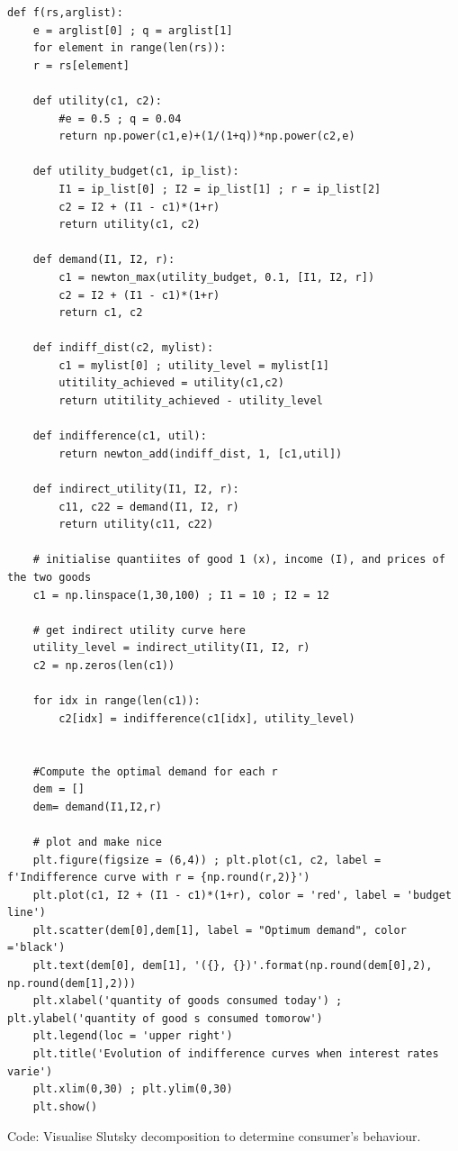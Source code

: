 \documentclass[a4paper, 12pt, reqno]{article}
\begin{document}
\begin{lstlisting}[frame=single]
def f(rs,arglist):
    e = arglist[0] ; q = arglist[1]
    for element in range(len(rs)):
    r = rs[element]

    def utility(c1, c2):
        #e = 0.5 ; q = 0.04
        return np.power(c1,e)+(1/(1+q))*np.power(c2,e)

    def utility_budget(c1, ip_list):
        I1 = ip_list[0] ; I2 = ip_list[1] ; r = ip_list[2]
        c2 = I2 + (I1 - c1)*(1+r)
        return utility(c1, c2)
        
    def demand(I1, I2, r):
        c1 = newton_max(utility_budget, 0.1, [I1, I2, r])
        c2 = I2 + (I1 - c1)*(1+r)
        return c1, c2

    def indiff_dist(c2, mylist): 
        c1 = mylist[0] ; utility_level = mylist[1]
        utitility_achieved = utility(c1,c2)
        return utitility_achieved - utility_level

    def indifference(c1, util):
        return newton_add(indiff_dist, 1, [c1,util])

    def indirect_utility(I1, I2, r):
        c11, c22 = demand(I1, I2, r)
        return utility(c11, c22)

    # initialise quantiites of good 1 (x), income (I), and prices of the two goods
    c1 = np.linspace(1,30,100) ; I1 = 10 ; I2 = 12

    # get indirect utility curve here
    utility_level = indirect_utility(I1, I2, r)
    c2 = np.zeros(len(c1))

    for idx in range(len(c1)):
        c2[idx] = indifference(c1[idx], utility_level)


    #Compute the optimal demand for each r
    dem = []
    dem= demand(I1,I2,r)    

    # plot and make nice
    plt.figure(figsize = (6,4)) ; plt.plot(c1, c2, label = f'Indifference curve with r = {np.round(r,2)}')
    plt.plot(c1, I2 + (I1 - c1)*(1+r), color = 'red', label = 'budget line')
    plt.scatter(dem[0],dem[1], label = "Optimum demand", color ='black')
    plt.text(dem[0], dem[1], '({}, {})'.format(np.round(dem[0],2), np.round(dem[1],2)))
    plt.xlabel('quantity of goods consumed today') ; plt.ylabel('quantity of good s consumed tomorow')
    plt.legend(loc = 'upper right')
    plt.title('Evolution of indifference curves when interest rates varie')
    plt.xlim(0,30) ; plt.ylim(0,30)
    plt.show()

\end{lstlisting} 
\hfill
Code: Visualise Slutsky decomposition to determine consumer's behaviour. 
\end{document}
